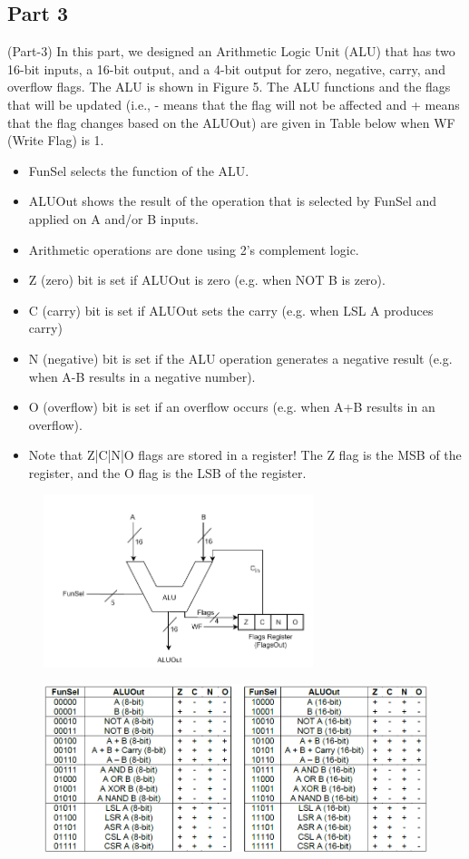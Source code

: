 \documentclass[pdftex,12pt,a4paper]{article}
\begin{document}
\subsection{Part 3}
(Part-3) In this part, we designed an Arithmetic Logic Unit (ALU) that has two 16-bit inputs, a 16-bit output, and a 4-bit output for zero, negative, carry, and overflow flags. The ALU is shown in Figure 5. The ALU functions and the flags that will be updated (i.e., - means that the flag will not be affected and + means that the flag changes based on the ALUOut) are given in Table below when WF (Write Flag) is 1.
\newpage 
\begin{itemize}
	\item FunSel selects the function of the ALU.
	\item ALUOut shows the result of the operation that is selected by FunSel and applied on A and/or B inputs.
	\item Arithmetic operations are done using 2’s complement logic.
	\item Z (zero) bit is set if ALUOut is zero (e.g. when NOT B is zero).
	\item C (carry) bit is set if ALUOut sets the carry (e.g. when LSL A produces carry)
	\item N (negative) bit is set if the ALU operation generates a negative result (e.g. when A-B results in a negative number).
	\item O (overflow) bit is set if an overflow occurs (e.g. when A+B results in an overflow).
	\item Note that Z|C|N|O flags are stored in a register! The Z flag is the MSB of the register, and the O flag is the LSB of the register.
\end{itemize}
\begin{figure}[htbp]
	\centering
	\includegraphics[width=0.7\textwidth]{Part 3 Image}
\end{figure}
\begin{figure}[H]
	\centering
	\includegraphics[width=1.0\textwidth]{Part 3 t1}
\end{figure}
\end{document}
